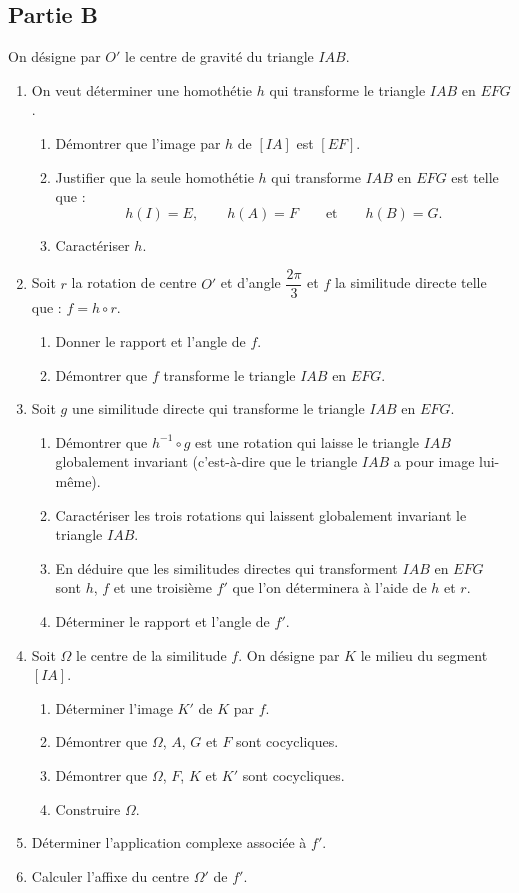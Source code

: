 \subsection*{Partie B}

On désigne par $O'$ le centre de gravité du triangle $IAB$.

\begin{enumerate}
	\item On veut déterminer une homothétie $h$ qui transforme le triangle $IAB$ en $EFG$.
	\begin{enumerate}
		\item Démontrer que l'image par $h$ de $[IA]$ est $[EF]$.
		\item Justifier que la seule homothétie $h$ qui transforme $IAB$ en $EFG$ est telle que :
		\[
		h(I)=E, \qquad h(A)=F \qquad \text{et} \qquad h(B)=G.
		\]
		\item Caractériser $h$.
	\end{enumerate}
	\item Soit $r$ la rotation de centre $O'$ et d'angle $\dfrac{2\pi}{3}$ et $f$ la similitude directe telle que : $f=h\circ r$.
	\begin{enumerate}
		\item Donner le rapport et l'angle de $f$.
		\item Démontrer que $f$ transforme le triangle $IAB$ en $EFG$.
	\end{enumerate}
	\item Soit $g$ une similitude directe qui transforme le triangle $IAB$ en $EFG$.
	\begin{enumerate}
		\item Démontrer que $h^{-1}\circ g$ est une rotation qui laisse le triangle $IAB$ globalement invariant (c'est-à-dire que le triangle $IAB$ a pour image lui-même).
		\item Caractériser les trois rotations qui laissent globalement invariant le triangle $IAB$.
		\item En déduire que les similitudes directes qui transforment $IAB$ en $EFG$ sont $h$, $f$ et une troisième $f'$ que l'on déterminera à l'aide de $h$ et $r$.
		\item Déterminer le rapport et l'angle de $f'$.
	\end{enumerate}
	\item Soit $\Omega$ le centre de la similitude $f$. On désigne par $K$ le milieu du segment $[IA]$.
	\begin{enumerate}
		\item Déterminer l'image $K'$ de $K$ par $f$.
		\item Démontrer que $\Omega$, $A$, $G$ et $F$ sont cocycliques.
		\item Démontrer que $\Omega$, $F$, $K$ et $K'$ sont cocycliques.
		\item Construire $\Omega$.
	\end{enumerate}
	\item Déterminer l'application complexe associée à $f'$.
	\item Calculer l'affixe du centre $\Omega'$ de $f'$.
\end{enumerate}
